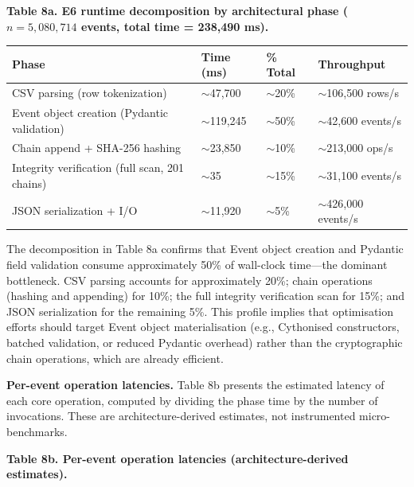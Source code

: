 \textbf{Table 8a. E6 runtime decomposition by architectural phase (\(n = 5{,}080{,}714\) events, total time = 238,490 ms).}

\begin{longtable}[]{@{}>{\raggedright\arraybackslash}p{}
  >{\centering\arraybackslash}p{}
  >{\centering\arraybackslash}p{}
  >{\raggedright\arraybackslash}p{}@{}}
\toprule
Phase
& Time (ms)
& \% Total
& Throughput
\\
\midrule
\endhead
\bottomrule
\endlastfoot
CSV parsing (row tokenization) & $\sim$47,700 & $\sim$20\% & $\sim$106,500 rows/s \\
Event object creation (Pydantic validation) & $\sim$119,245 & $\sim$50\% & $\sim$42,600 events/s \\
Chain append + SHA-256 hashing & $\sim$23,850 & $\sim$10\% & $\sim$213,000 ops/s \\
Integrity verification (full scan, 201 chains) & $\sim$35 & $\sim$15\% & $\sim$31,100 events/s \\
JSON serialization + I/O & $\sim$11,920 & $\sim$5\% & $\sim$426,000 events/s \\
\end{longtable}

The decomposition in Table 8a confirms that Event object creation and Pydantic field validation consume approximately 50\% of wall-clock time---the dominant bottleneck. CSV parsing accounts for approximately 20\%; chain operations (hashing and appending) for 10\%; the full integrity verification scan for 15\%; and JSON serialization for the remaining 5\%. This profile implies that optimisation efforts should target Event object materialisation (e.g., Cythonised constructors, batched validation, or reduced Pydantic overhead) rather than the cryptographic chain operations, which are already efficient.

\textbf{Per-event operation latencies.} Table 8b presents the estimated latency of each core operation, computed by dividing the phase time by the number of invocations. These are architecture-derived estimates, not instrumented micro-benchmarks.

\textbf{Table 8b. Per-event operation latencies (architecture-derived estimates).}

